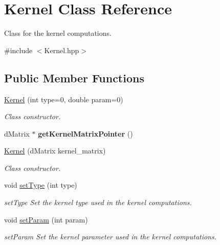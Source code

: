 \hypertarget{class_kernel}{}\section{Kernel Class Reference}
\label{class_kernel}


Class for the kernel computations.  




{\ttfamily \#include $<$Kernel.\+hpp$>$}

\subsection*{Public Member Functions}
\begin{DoxyCompactItemize}
\item 
\mbox{\label{class_kernel_ae60e072c58cdc16842a239bdd0761590}} 
\mbox{\hyperlink{class_kernel_ae60e072c58cdc16842a239bdd0761590}{Kernel}} (int type=0, double param=0)
\begin{DoxyCompactList}\small\item\em Class constructor. \end{DoxyCompactList}\item 
\mbox{\label{class_kernel_a4dc45b11849fada00d52060cee27730b}} 
d\+Matrix $\ast$ {\bfseries get\+Kernel\+Matrix\+Pointer} ()
\item 
\mbox{\hyperlink{class_kernel_adf23c1567adb8ddb5757931587320871}{Kernel}} (d\+Matrix kernel\+\_\+matrix)
\begin{DoxyCompactList}\small\item\em Class constructor. \end{DoxyCompactList}\item 
void \mbox{\hyperlink{class_kernel_ad01e209470accf44ea240078f39fb127}{set\+Type}} (int type)
\begin{DoxyCompactList}\small\item\em set\+Type Set the kernel type used in the kernel computations. \end{DoxyCompactList}\item 
void \mbox{\hyperlink{class_kernel_a4fe711ebdbc168be1733fbb8aea6cf92}{set\+Param}} (int param)
\begin{DoxyCompactList}\small\item\em set\+Param Set the kernel parameter used in the kernel computations. \end{DoxyCompactList}\item 

\end{DoxyCompactItemize}
